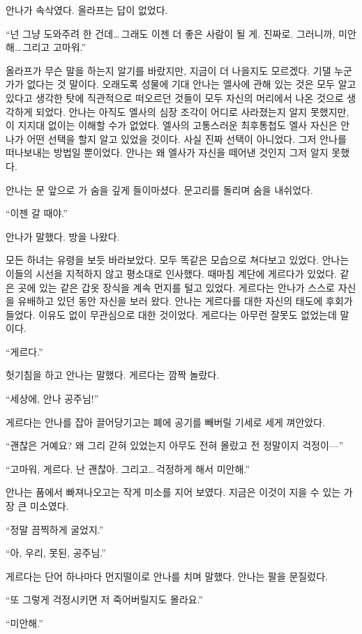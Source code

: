 안나가 속삭였다. 올라프는 답이 없었다.

``넌 그냥 도와주려 한 건데\ldots\,그래도 이젠 더 좋은 사람이 될 게. 진짜로. 그러니까, 미안해\ldots\,그리고 고마워.''

올라프가 무슨 말을 하는지 알기를 바랐지만, 지금이 더 나을지도 모르겠다. 기댈 누군가가 없다는 것 말이다. 오래도록 성물에 기대 안나는 엘사에 관해 있는 것은 모두 알고 있다고 생각한 탓에 직관적으로 떠오르던 것들이 모두 자신의 머리에서 나온 것으로 생각하게 되었다. 안나는 아직도 엘사의 심장 조각이 어디로 사라졌는지 알지 못했지만, 이 지지대 없이는 이해할 수가 없었다. 엘사의 고통스러운 최후통첩도 엘사 자신은 안나가 어떤 선택을 할지 알고 있었을 것이다. 사실 진짜 선택이 아니었다. 그저 안나를 떠나보내는 방법일 뿐이었다. 안나는 왜 엘사가 자신을 떼어낸 것인지 그저 알지 못했다.

안나는 문 앞으로 가 숨을 깊게 들이마셨다. 문고리를 돌리며 숨을 내쉬었다.

``이젠 갈 때야.''

안나가 말했다. 방을 나왔다.

모든 하녀는 유령을 보듯 바라보았다. 모두 똑같은 모습으로 쳐다보고 있었다. 안나는 이들의 시선을 지적하지 않고 평소대로 인사했다. 때마침 계단에 게르다가 있었다. 같은 곳에 있는 같은 갑옷 장식을 계속 먼지를 털고 있었다. 게르다는 안나가 스스로 자신을 유배하고 있던 동안 자신을 보러 왔다. 안나는 게르다를 대한 자신의 태도에 후회가 들었다. 이유도 없이 무관심으로 대한 것이었다. 게르다는 아무런 잘못도 없었는데 말이다.

``게르다.''

헛기침을 하고 안나는 말했다. 게르다는 깜짝 놀랐다.

``세상에, 안나 공주님!''

게르다는 안나를 잡아 끌어당기고는 폐에 공기를 빼버릴 기세로 세게 껴안았다.

``괜찮은 거예요? 왜 그리 갇혀 있었는지 아무도 전혀 몰랐고 전 정말이지 걱정이—''

``고마워, 게르다. 난 괜찮아. 그리고\ldots\,걱정하게 해서 미안해.''

안나는 품에서 빠져나오고는 작게 미소를 지어 보였다. 지금은 이것이 지을 수 있는 가장 큰 미소였다.

``정말 끔찍하게 굴었지.''

``아, 우리, 못된, 공주님.''

게르다는 단어 하나마다 먼지떨이로 안나를 치며 말했다. 안나는 팔을 문질렀다.

``또 그렇게 걱정시키면 저 죽어버릴지도 몰라요.''

``미안해.''

